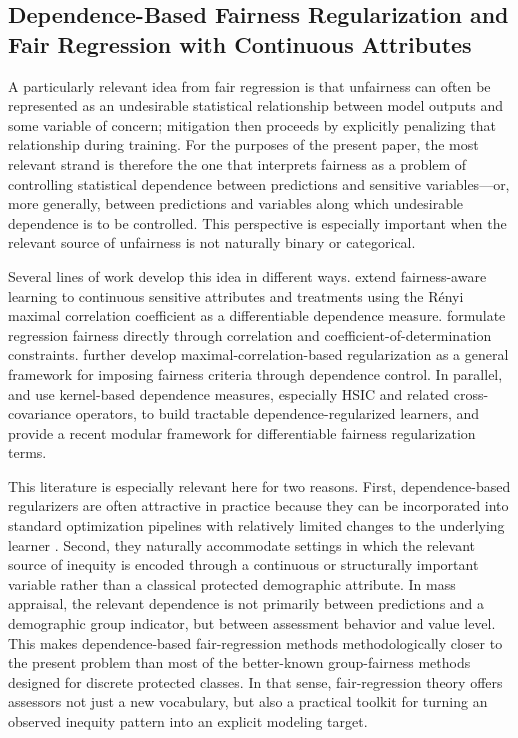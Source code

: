 \documentclass[12pt, draft]{article}
\theoremstyle{plain}
\theoremstyle{definition}
\newcommand{\1}{\mathbf{1}}
\begin{document}
\subsection{Dependence-Based Fairness Regularization and Fair Regression with Continuous Attributes}

A particularly relevant idea from fair regression is that unfairness can often be represented as an undesirable statistical relationship between model outputs and some variable of concern; mitigation then proceeds by explicitly penalizing that relationship during training. For the purposes of the present paper, the most relevant strand is therefore the one that interprets fairness as a problem of controlling statistical dependence between predictions and sensitive variables---or, more generally, between predictions and variables along which undesirable dependence is to be controlled. This perspective is especially important when the relevant source of unfairness is not naturally binary or categorical.

Several lines of work develop this idea in different ways. \textcite{MaryEtAl2019} extend fairness-aware learning to continuous sensitive attributes and treatments using the R\'enyi maximal correlation coefficient as a differentiable dependence measure. \textcite{KomiyamaEtAl2018} formulate regression fairness directly through correlation and coefficient-of-determination constraints. \textcite{lee2022maximal} further develop maximal-correlation-based regularization as a general framework for imposing fairness criteria through dependence control. In parallel, \textcite{PerezSuayEtAl2017} and \textcite{LiEtAl2022Fairness} use kernel-based dependence measures, especially HSIC and related cross-covariance operators, to build tractable dependence-regularized learners, and \textcite{BuylDefranceDeBie2024FAIRRET} provide a recent modular framework for differentiable fairness regularization terms.

This literature is especially relevant here for two reasons. First, dependence-based regularizers are often attractive in practice because they can be incorporated into standard optimization pipelines with relatively limited changes to the underlying learner \cite{KomiyamaEtAl2018,MaryEtAl2019,LiEtAl2022Fairness,lee2022maximal,BuylDefranceDeBie2024FAIRRET}. Second, they naturally accommodate settings in which the relevant source of inequity is encoded through a continuous or structurally important variable rather than a classical protected demographic attribute. In mass appraisal, the relevant dependence is not primarily between predictions and a demographic group indicator, but between assessment behavior and value level. This makes dependence-based fair-regression methods methodologically closer to the present problem than most of the better-known group-fairness methods designed for discrete protected classes. In that sense, fair-regression theory offers assessors not just a new vocabulary, but also a practical toolkit for turning an observed inequity pattern into an explicit modeling target.
\end{document}
